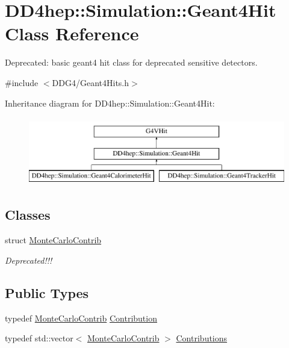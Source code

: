\hypertarget{class_d_d4hep_1_1_simulation_1_1_geant4_hit}{}\section{D\+D4hep\+:\+:Simulation\+:\+:Geant4\+Hit Class Reference}
\label{class_d_d4hep_1_1_simulation_1_1_geant4_hit}


Deprecated\+: basic geant4 hit class for deprecated sensitive detectors.  




{\ttfamily \#include $<$D\+D\+G4/\+Geant4\+Hits.\+h$>$}

Inheritance diagram for D\+D4hep\+:\+:Simulation\+:\+:Geant4\+Hit\+:\begin{figure}[H]
\begin{center}
\leavevmode
\includegraphics[height=3.000000cm]{class_d_d4hep_1_1_simulation_1_1_geant4_hit}
\end{center}
\end{figure}
\subsection*{Classes}
\begin{DoxyCompactItemize}
\item 
struct \hyperlink{struct_d_d4hep_1_1_simulation_1_1_geant4_hit_1_1_monte_carlo_contrib}{Monte\+Carlo\+Contrib}
\begin{DoxyCompactList}\small\item\em Deprecated!!! \end{DoxyCompactList}\end{DoxyCompactItemize}
\subsection*{Public Types}
\begin{DoxyCompactItemize}
\item 
typedef \hyperlink{struct_d_d4hep_1_1_simulation_1_1_geant4_hit_1_1_monte_carlo_contrib}{Monte\+Carlo\+Contrib} \hyperlink{class_d_d4hep_1_1_simulation_1_1_geant4_hit_a03a5270c4d1410302fe278ce6a47f268}{Contribution}
\item 
typedef std\+::vector$<$ \hyperlink{struct_d_d4hep_1_1_simulation_1_1_geant4_hit_1_1_monte_carlo_contrib}{Monte\+Carlo\+Contrib} $>$ \hyperlink{class_d_d4hep_1_1_simulation_1_1_geant4_hit_acdc278ce7e641d337b024d5fc8f52a2c}{Contributions}
\end{DoxyCompactItemize}
